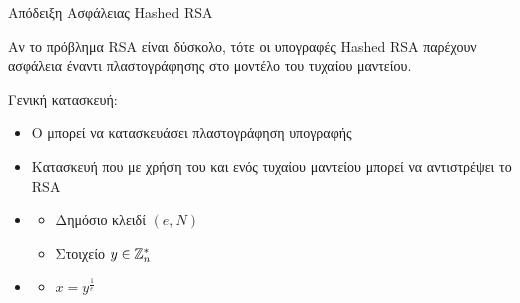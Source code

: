 \documentclass{beamer}
\begin{document}
\begin{frame}{Απόδειξη Ασφάλειας Hashed RSA}
\begin{theorem}
Αν το πρόβλημα RSA είναι δύσκολο, τότε οι υπογραφές Hashed RSA παρέχουν ασφάλεια έναντι πλαστογράφησης στο μοντέλο του τυχαίου μαντείου.
\end{theorem}
\pause
Γενική κατασκευή:
\begin{itemize}
\item Ο \adv μπορεί να κατασκευάσει πλαστογράφηση υπογραφής
\pause
\item Κατασκευή \advb που με χρήση του \adv και ενός τυχαίου μαντείου μπορεί να αντιστρέψει το RSA
\pause
\item {}
\begin{itemize}
\item Δημόσιο κλειδί $(e,N)$
\pause
\item Στοιχείο $y \in \mathbb{Z}^*_n$
\pause
\end{itemize}
\item {}
\begin{itemize}
\item $x=y^\frac{1}{e}$
\end{itemize}
\end{itemize}
\end{frame}
\end{document}
